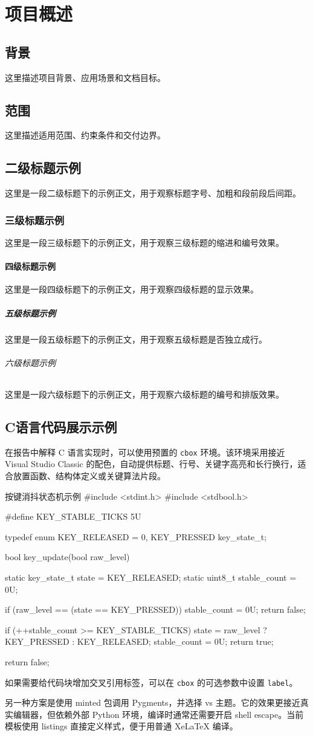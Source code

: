 \chapter{项目概述}
\section{背景}
这里描述项目背景、应用场景和文档目标。

\section{范围}
这里描述适用范围、约束条件和交付边界。

\section{二级标题示例}
这里是一段二级标题下的示例正文，用于观察标题字号、加粗和段前段后间距。

\subsection{三级标题示例}
这里是一段三级标题下的示例正文，用于观察三级标题的缩进和编号效果。

\subsubsection{四级标题示例}
这里是一段四级标题下的示例正文，用于观察四级标题的显示效果。

\paragraph{五级标题示例}
这里是一段五级标题下的示例正文，用于观察五级标题是否独立成行。

\subparagraph{六级标题示例}
这里是一段六级标题下的示例正文，用于观察六级标题的编号和排版效果。

\section{C语言代码展示示例}
在报告中解释 C 语言实现时，可以使用预置的 \verb|cbox| 环境。该环境采用接近 Visual Studio Classic 的配色，自动提供标题、行号、关键字高亮和长行换行，适合放置函数、结构体定义或关键算法片段。

\begin{cbox}{按键消抖状态机示例}
#include <stdint.h>
#include <stdbool.h>

#define KEY_STABLE_TICKS  5U

typedef enum {
  KEY_RELEASED = 0,
  KEY_PRESSED
} key_state_t;

bool key_update(bool raw_level)
{
  static key_state_t state = KEY_RELEASED;
  static uint8_t stable_count = 0U;

  if (raw_level == (state == KEY_PRESSED)) {
    stable_count = 0U;
    return false;
  }

  if (++stable_count >= KEY_STABLE_TICKS) {
    state = raw_level ? KEY_PRESSED : KEY_RELEASED;
    stable_count = 0U;
    return true;
  }

  return false;
}
\end{cbox}

如果需要给代码块增加交叉引用标签，可以在 \verb|cbox| 的可选参数中设置 \verb|label|。

另一种方案是使用 minted 包调用 Pygments，并选择 vs 主题。它的效果更接近真实编辑器，但依赖外部 Python 环境，编译时通常还需要开启 shell escape。当前模板使用 listings 直接定义样式，便于用普通 XeLaTeX 编译。
